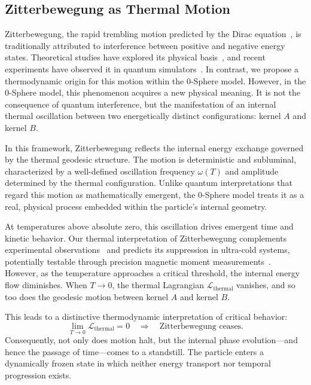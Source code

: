 \documentclass[%
 reprint,
 amsmath,amssymb,
 aps,
]{revtex4-1}
\numberwithin{equation}{section}%
\begin{document}
\subsection{Zitterbewegung as Thermal Motion}
\label{subsec:zitterbewegung_thermal}

Zitterbewegung, the rapid trembling motion predicted by the Dirac equation~\cite{dirac1928}, is traditionally attributed to interference between positive and negative energy states. Theoretical studies have explored its physical basis~\cite{barut1981, hestenes1990}, and recent experiments have observed it in quantum simulators~\cite{gerritsma2010, leblanc2013}. In contrast, we propose a thermodynamic origin for this motion within the 0-Sphere model. However, in the 0-Sphere model, this phenomenon acquires a new physical meaning. It is not the consequence of quantum interference, but the manifestation of an internal thermal oscillation between two energetically distinct configurations: kernel $A$ and kernel $B$.

In this framework, Zitterbewegung reflects the internal energy exchange governed by the thermal geodesic structure. The motion is deterministic and subluminal, characterized by a well-defined oscillation frequency $\omega(T)$ and amplitude determined by the thermal configuration. Unlike quantum interpretations that regard this motion as mathematically emergent, the 0-Sphere model treats it as a real, physical process embedded within the particle's internal geometry.

At temperatures above absolute zero, this oscillation drives emergent time and kinetic behavior. Our thermal interpretation of Zitterbewegung complements experimental observations~\cite{gerritsma2010, leblanc2013} and predicts its suppression in ultra-cold systems, potentially testable through precision magnetic moment measurements~\cite{fan2023}. However, as the temperature approaches a critical threshold, the internal energy flow diminishes. When $T \to 0$, the thermal Lagrangian $\mathcal{L}_{\text{thermal}}$ vanishes, and so too does the geodesic motion between kernel $A$ and kernel $B$.

This leads to a distinctive thermodynamic interpretation of critical behavior:
\begin{equation} \label{eq:Lthermal_zero}
\lim_{T \to 0} \mathcal{L}_{\text{thermal}} = 0 \quad \Rightarrow \quad \text{Zitterbewegung ceases.}
\end{equation}
Consequently, not only does motion halt, but the internal phase evolution---and hence the passage of time---comes to a standstill. The particle enters a dynamically frozen state in which neither energy transport nor temporal progression exists.
\end{document}
